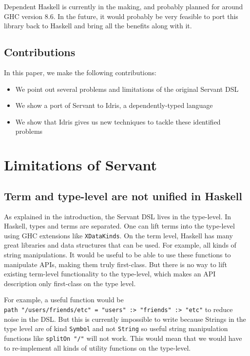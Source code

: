 \documentclass[12pt,a4paper]{article}
\begin{document}
Dependent Haskell is currently in the making, and probably planned for around GHC version 8.6. In the future, it would probably be very feasible to port this library back to Haskell and bring all the benefits along with it.

\subsection{Contributions}
In this paper, we make the following contributions:

\begin{itemize}
  \item We point out several problems and limitations of the original Servant DSL
  \item We show a port of Servant to Idris, a dependently-typed language
  \item We show that Idris gives us new techniques to tackle these identified problems
\end{itemize}

\section{Limitations of Servant}\label{sec:issues}
\subsection{Term and type-level are not unified in Haskell}
As explained in the introduction, the Servant DSL lives in the type-level. In Haskell, types and terms are separated. One can lift terms into the type-level using GHC extensions like \texttt{XDataKinds}.  On the term level, Haskell has many great libraries and data structures that can be used. For example, all kinds of string manipulations. It would be useful to be able to use these functions to manipulate APIs, making them truly first-class. But there is no way to lift existing term-level functionality to the type-level, which makes an API description only first-class on the type level.

For example, a useful function would be \\ \texttt{path "/users/friends/etc" = "users" :> "friends" :> "etc"} to reduce noise in the DSL\@. But this is currently impossible to write because Strings in the type level are of kind \texttt{Symbol} and not \texttt{String} so useful string manipulation functions like \texttt{splitOn "/"} will not work. This would mean that we would have to re-implement all kinds of utility functions on the type-level.
\end{document}
